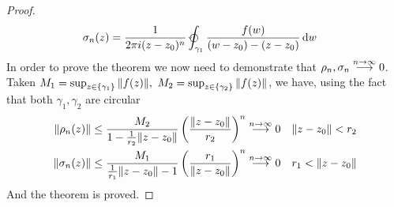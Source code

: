 \documentclass[../complete.tex]{subfiles}
\begin{document}
\begin{proof}
\begin{equation*}
\begin{aligned}
			\sigma_n(z)&=\frac{1}{2\pi i(z-z_0)^n}\ointccw_{\gamma_1}\frac{f(w)}{(w-z_0)-(z-z_0)}\diff w
		\end{aligned}
	\end{equation*}
	In order to prove the theorem we now need to demonstrate that $\rho_n,\sigma_n\fto[n\to\infty]0$. Taken $M_1=\sup_{z\in\{\gamma_1\}}\norm{f(z)},\ M_2=\sup_{z\in\{\gamma_2\}}\norm{f(z)}$, we have, using the fact that both $\gamma_1,\gamma_2$ are circular
	\begin{equation*}
		\begin{aligned}
			\norm{\rho_n(z)}&\le\frac{M_2}{1-\frac{1}{r_2}\norm{z-z_0}}\left( \frac{\norm{z-z_0}}{r_2} \right)^n\fto[n\to\infty]0\quad\norm{z-z_0}<r_2\\
			\norm{\sigma_n(z)}&\le\frac{M_1}{\frac{1}{r_1}\norm{z-z_0}-1}\left( \frac{r_1}{\norm{z-z_0}} \right)^n\fto[n\to\infty]0\quad r_1<\norm{z-z_0}
		\end{aligned}
	\end{equation*}
	And the theorem is proved.
\end{proof}
\end{document}
